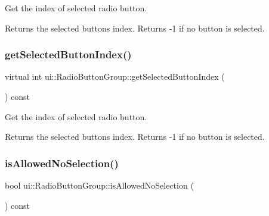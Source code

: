 Get the index of selected radio button.

\begin{DoxyReturn}{Returns}
the selected button\textquotesingle{}s index. Returns -\/1 if no button is selected. 
\end{DoxyReturn}
\mbox{\label{classui_1_1RadioButtonGroup_a0e7dbe4a90c81cc417fdbdde97ac2f12}} 
\subsubsection{\texorpdfstring{get\+Selected\+Button\+Index()}{getSelectedButtonIndex()}\hspace{0.1cm}{\footnotesize\ttfamily [2/2]}}
{\footnotesize\ttfamily virtual int ui\+::\+Radio\+Button\+Group\+::get\+Selected\+Button\+Index (\begin{DoxyParamCaption}{ }\end{DoxyParamCaption}) const\hspace{0.3cm}{\ttfamily [virtual]}}

Get the index of selected radio button.

\begin{DoxyReturn}{Returns}
the selected button\textquotesingle{}s index. Returns -\/1 if no button is selected. 
\end{DoxyReturn}
\mbox{\label{classui_1_1RadioButtonGroup_a9eafb80fea9559a6838d46321063d79a}} 
\subsubsection{\texorpdfstring{is\+Allowed\+No\+Selection()}{isAllowedNoSelection()}\hspace{0.1cm}{\footnotesize\ttfamily [1/2]}}
{\footnotesize\ttfamily bool ui\+::\+Radio\+Button\+Group\+::is\+Allowed\+No\+Selection (\begin{DoxyParamCaption}{ }\end{DoxyParamCaption}) const}

